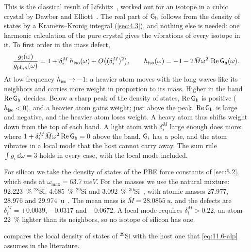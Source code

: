\noindent This is the classical result of Lifshitz~\cite{lifshitz1956some}, worked out for an isotope in a cubic crystal by Dawber and Elliott~\cite{dawber1963vibrations}. The real part of $\mathsf{G}_{\mathrm{h}}$ follows from the density of states by a Kramers--Kronig integral (\cref{sec:4.3}), and nothing else is needed: one harmonic calculation of the pure crystal gives the vibrations of every isotope in it. To first order in the mass defect,
\begin{equation}
  \frac{g_i(\omega)}{g_{\mathrm{ph},\kappa}(\omega)} = 1 + \delta^M_i\,h_{\mathrm{iso}}(\omega) + O\bigl((\delta^M_i)^2\bigr) , \qquad
  h_{\mathrm{iso}}(\omega) = -1 - 2\bar M\omega^2\,\operatorname{Re}\mathsf{G}_{\mathrm{h}}(\omega) .
  \label{eq:11.6-first}
\end{equation}
At low frequency $h_{\mathrm{iso}} \to -1$: a heavier atom moves with the long waves like its neighbors and carries more weight in proportion to its mass. Higher in the band $\operatorname{Re}\mathsf{G}_{\mathrm{h}}$ decides. Below a sharp peak of the density of states, $\operatorname{Re}\mathsf{G}_{\mathrm{h}}$ is positive ($h_{\mathrm{iso}} < 0$), and a heavier atom gains weight; just above the peak, $\operatorname{Re}\mathsf{G}_{\mathrm{h}}$ is large and negative, and the heavier atom loses weight. A heavy atom thus shifts weight down from the top of each band. A light atom with $\delta^M_i$ large enough does more: where $1 + \delta^M_i\bar M\omega^2\operatorname{Re}\mathsf{G}_{\mathrm{h}} = 0$ above the band, $\mathsf{G}_i$ has a pole, and the atom vibrates in a local mode that the host cannot carry away. The sum rule $\int g_i\,\dd\omega = 3$ holds in every case, with the local mode included.

For silicon we take the density of states of the PBE force constants of \cref{sec:5.2}, which ends at $\omega_{\mathrm{max}} = \SI{63.7}{meV}$. For the masses we use the natural mixture: \SI{92.223}{\percent} $^{28}$Si, \SI{4.685}{\percent} $^{29}$Si and \SI{3.092}{\percent} $^{30}$Si~\cite{meija2016isotopic}, with atomic masses 27.977, 28.976 and \SI{29.974}{u}~\cite{wang2021ame2020}. The mean mass is $\bar M = \SI{28.0855}{u}$, and the defects are $\delta^M_i = +0.0039$, $-0.0317$ and $-0.0672$. A local mode requires $\delta^M_i > 0.22$, an atom \SI{22}{\percent} lighter than its neighbors, so no isotope of silicon has one.

 compares the local density of states of $^{29}$Si with the host one that \cref{eq:11.6-alp} assumes in the literature.

